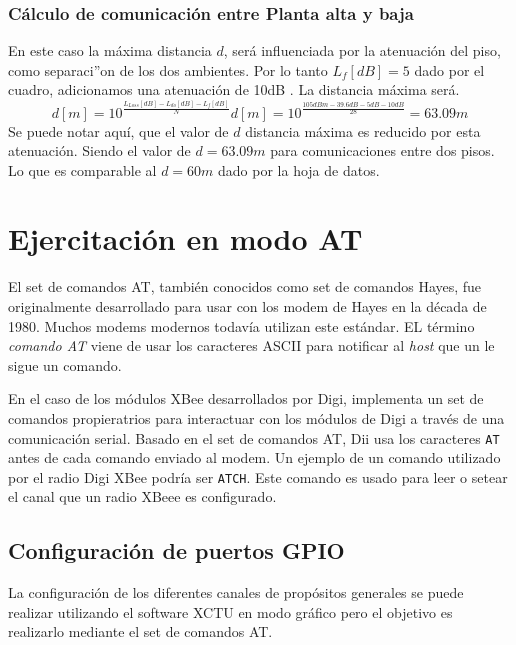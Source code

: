 \documentclass[11pt,oneside,spanish,a4paper]{article}
\begin{document}
\subsubsection{C\'alculo de comunicaci\'on entre Planta alta y baja}
En este caso la m\'axima distancia $d$, ser\'a influenciada por la atenuaci\'on del piso, como separaci''on de los dos ambientes. Por lo tanto $L_{f}[dB]=5$ dado por el cuadro, adicionamos una atenuaci\'on de 10dB . La distancia m\'axima ser\'a.
\begin{equation*}
\label{eq:calculod}
d[m] = 10 ^{\frac{L_{Loss}[dB] - L_{do}[dB] - L_{f}[dB]}{N}} 
d[m] = 10 ^{\frac{105dBm - 39.6dB - 5dB -10dB}{28}} = 63.09m
\end{equation*}
Se puede notar aqu\'i, que el valor de $d$ distancia m\'axima es reducido por esta atenuaci\'on. Siendo el valor de $d=63.09m$ para comunicaciones entre dos pisos. Lo que es comparable al $d=60m$ dado por la hoja de datos.

\section{Ejercitación en modo AT}
\label{sec:AT}

El set de comandos AT, también conocidos como set de comandos Hayes,
fue originalmente desarrollado para usar con los modem de Hayes en la
década de 1980. Muchos modems modernos todavía utilizan este
estándar. EL término \emph{comando AT}  viene de usar los caracteres
ASCII para notificar al \textsl{host}  que un le sigue un comando. 

En el caso de los módulos XBee desarrollados por Digi, implementa un
set de comandos propieratrios para interactuar con los módulos de
Digi a través de una comunicación serial. Basado en el set de comandos
AT, Dii usa los caracteres \texttt{AT} antes de cada comando enviado
al modem. Un ejemplo de un comando utilizado por el radio Digi XBee
podría ser \texttt{ATCH}. Este comando es usado para leer o setear el
canal que un radio XBeee es configurado\cite{at-cmds}.

\subsection{Configuración de puertos GPIO}
\label{sec:config-at}

La configuración de los diferentes canales de propósitos generales se
puede realizar utilizando el software XCTU en modo gráfico pero el
objetivo es realizarlo mediante el set de comandos AT. 
\end{document}
